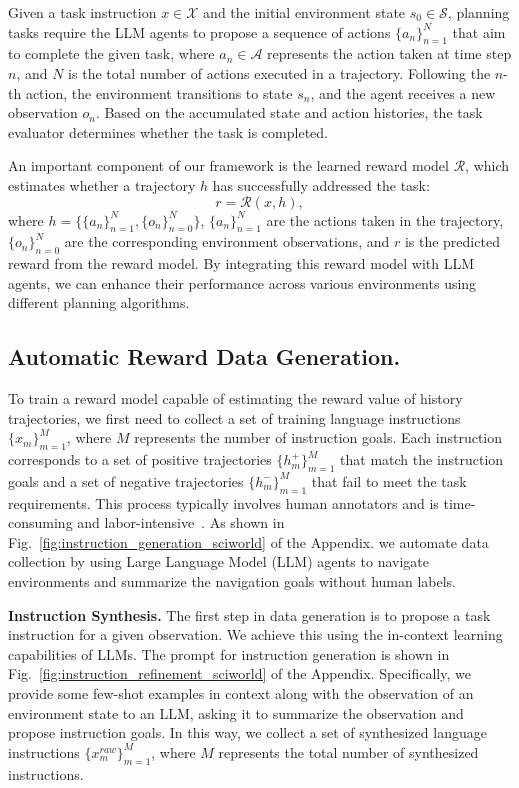 Given a task instruction $\mathit{x} \in \mathcal{X}$ and the initial environment state $\mathit{s_0} \in \mathcal{S}$, planning tasks require the LLM agents to propose a sequence of actions ${\{a_n\}_{n=1}^{N}}$ that aim to complete the given task, where $a_n \in \mathcal{A}$ represents the action taken at time step $n$, and $N$ is the total number of actions executed in a trajectory.
Following the $n$-th action, the environment transitions to state $\mathit{s_{n}}$, and the agent receives a new observation $\mathit{o_{n}}$. Based on the accumulated state and action histories, the task evaluator determines whether the task is completed.

An important component of our framework is the learned reward model $\mathcal{R}$, which estimates whether a trajectory $h$ has successfully addressed the task:
\begin{equation}
    r = \mathcal{R}(\mathit{x}, h),
\end{equation}
where $h = \{\{a_n\}_{n=1}^N, \{o_n\}_{n=0}^{N}\}$, $\{a_n\}_{n=1}^N$ are the actions taken in the trajectory, $\{o_n\}_{n=0}^{N}$ are the corresponding environment observations, and $r$ is the predicted reward from the reward model.
By integrating this reward model with LLM agents, we can enhance their performance across various environments using different planning algorithms.

\subsection{ Automatic Reward Data Generation.}
\label{sec:data}
To train a reward model capable of estimating the reward value of history trajectories, we first need to collect a set of training language instructions $\{x_m\}_{m=1}^M$, where $M$ represents the number of instruction goals. Each instruction corresponds to a set of positive trajectories $\{h_m^+\}_{m=1}^M$ that match the instruction goals and a set of negative trajectories $\{h_m^-\}_{m=1}^M$ that fail to meet the task requirements. This process typically involves human annotators and is time-consuming and labor-intensive~\citep{christiano2017deep,rafailov2024direct}. As shown in Fig.~\ref{fig:instruction_generation_sciworld} of the Appendix. we automate data collection by using Large Language Model (LLM) agents to navigate environments and summarize the navigation goals without human labels.

\noindent\textbf{Instruction Synthesis.} The first step in data generation is to propose a task instruction for a given observation. We achieve this using the in-context learning capabilities of LLMs. The prompt for instruction generation is shown in Fig.~\ref{fig:instruction_refinement_sciworld} of the Appendix. Specifically, we provide some few-shot examples in context along with the observation of an environment state to an LLM, asking it to summarize the observation and propose instruction goals. In this way, we collect a set of synthesized language instructions $\{x_m^{raw}\}_{m=1}^M$, where $M$ represents the total number of synthesized instructions.

